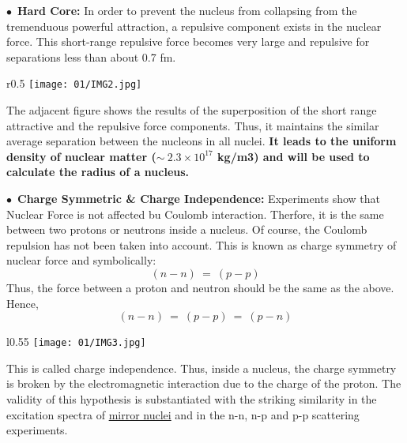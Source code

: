         $\bullet$~\textbf{Hard Core:} In order to prevent the nucleus from collapsing from the tremenduous powerful attraction, a repulsive component exists in the nuclear force. This short-range repulsive force becomes very large and repulsive for separations less than about 0.7 fm.
        \begin{wrapfigure}{r}{0.5\textwidth}
        \texttt{[image: 01/IMG2.jpg]}
        \end{wrapfigure}
        The adjacent figure shows the results of the superposition of the short range attractive and the repulsive force components. Thus, it maintains the similar average separation between the nucleons in all nuclei.\textbf{ It leads to the uniform density of nuclear matter ($\sim~2.3×10^{17}$ kg/m3) and will be used to calculate the radius of a nucleus.}   
        
        $\bullet$~\textbf{Charge Symmetric \& Charge Independence:} Experiments show that Nuclear Force is not affected bu Coulomb interaction. Therfore, it is the same between two protons or neutrons inside a nucleus. Of course, the Coulomb repulsion has not been taken into account. This is known as charge symmetry of nuclear force and symbolically:
        \begin{equation}
            (n-n)~=~(p-p)
        \end{equation}
Thus,  the force between a proton and neutron should be the same as the above. Hence,
        \begin{equation}
            (n-n)~=~(p-p)~=~(p-n)
        \end{equation}
 
         \begin{wrapfigure}{l}{0.55\textwidth}
        \texttt{[image: 01/IMG3.jpg]}
        \end{wrapfigure}
This is called charge independence. Thus, inside a nucleus, the charge symmetry is broken by the electromagnetic interaction due to the charge of the proton. The validity of this hypothesis is substantiated with the striking similarity in the excitation spectra of \href{https://en.wikipedia.org/wiki/Mirror_nuclei}{mirror nuclei} and in the n-n, n-p and p-p scattering experiments.


